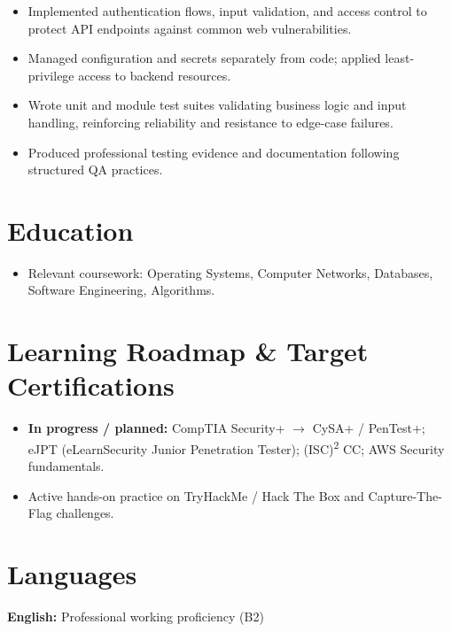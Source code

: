 \documentclass[10pt]{article}
\begin{document}
\begin{itemize}
  \item Implemented authentication flows, input validation, and access control to protect API endpoints against common web vulnerabilities.
  \item Managed configuration and secrets separately from code; applied least-privilege access to backend resources.
\end{itemize}

\begin{itemize}
  \item Wrote unit and module test suites validating business logic and input handling, reinforcing reliability and resistance to edge-case failures.
  \item Produced professional testing evidence and documentation following structured QA practices.
\end{itemize}

\section{Education}
\begin{itemize}
  \item Relevant coursework: Operating Systems, Computer Networks, Databases, Software Engineering, Algorithms.
\end{itemize}

\section{Learning Roadmap \& Target Certifications}
\begin{itemize}
  \item \textbf{In progress / planned:} CompTIA Security+ $\rightarrow$ CySA+ / PenTest+; eJPT (eLearnSecurity Junior Penetration Tester); (ISC)\textsuperscript{2} CC; AWS Security fundamentals.
  \item Active hands-on practice on TryHackMe / Hack The Box and Capture-The-Flag challenges.
\end{itemize}

\section{Languages}
 \quad\textbullet\quad \textbf{English:} Professional working proficiency (B2)
\end{document}
